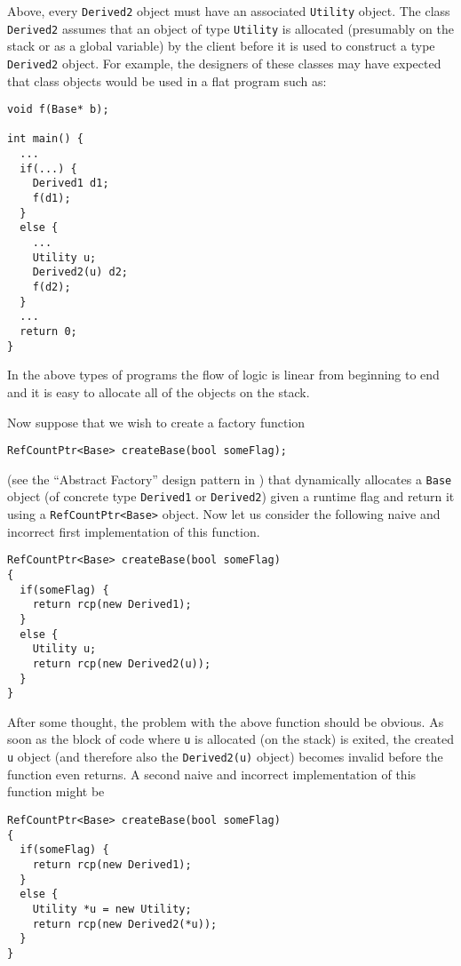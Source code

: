 {}\noindent{}Above, every {}\texttt{Derived2} object must have an
associated {}\texttt{Utility} object.  The class {}\texttt{Derived2}
assumes that an object of type {}\texttt{Utility} is allocated
(presumably on the stack or as a global variable) by the client before
it is used to construct a type {}\texttt{Derived2} object.  For
example, the designers of these classes may have expected that class
objects would be used in a flat program such as:

{\scriptsize\begin{verbatim}
void f(Base* b);

int main() {
  ...
  if(...) {
    Derived1 d1;
    f(d1);
  }
  else {
    ...
    Utility u;
    Derived2(u) d2;
    f(d2);
  }
  ...
  return 0;
}
\end{verbatim}}

{}\noindent{}In the above types of programs the flow of logic is
linear from beginning to end and it is easy to allocate all of the
objects on the stack.

Now suppose that we wish to create a factory function

{\scriptsize\begin{verbatim}
RefCountPtr<Base> createBase(bool someFlag);
\end{verbatim}}

{}\indent{}(see the ``Abstract Factory'' design pattern in
{}\cite{ref:gama_et_al_1995}) that dynamically allocates a
{}\texttt{Base} object (of concrete type {}\texttt{Derived1} or
{}\texttt{Derived2}) given a runtime flag and return it using a
{}\texttt{RefCountPtr<Base>} object.  Now let us consider the
following naive and incorrect first implementation of this function.

{\scriptsize\begin{verbatim}
RefCountPtr<Base> createBase(bool someFlag)
{
  if(someFlag) {
    return rcp(new Derived1);
  }
  else {
    Utility u;
    return rcp(new Derived2(u));
  }
}
\end{verbatim}

}{}\noindent{}After some thought, the problem with the above function
should be obvious.  As soon as the block of code where {}\texttt{u} is
allocated (on the stack) is exited, the created {}\texttt{u} object
(and therefore also the {}\texttt{Derived2(u)} object) becomes invalid
before the function even returns.  A second naive and incorrect
implementation of this function might be

{\scriptsize\begin{verbatim}
RefCountPtr<Base> createBase(bool someFlag)
{
  if(someFlag) {
    return rcp(new Derived1);
  }
  else {
    Utility *u = new Utility;
    return rcp(new Derived2(*u));
  }
}
\end{verbatim}}

